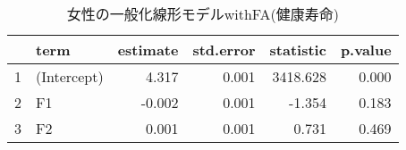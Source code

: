 \begin{table}[ht]
\centering
\begingroup\tiny
\begin{tabular}{rlrrrr}
  \hline
 & term & estimate & std.error & statistic & p.value \\ 
  \hline
1 & (Intercept) & 4.317 & 0.001 & 3418.628 & 0.000 \\ 
  2 & F1 & -0.002 & 0.001 & -1.354 & 0.183 \\ 
  3 & F2 & 0.001 & 0.001 & 0.731 & 0.469 \\ 
   \hline
\end{tabular}
\endgroup
\caption{女性の一般化線形モデルwithFA(健康寿命)} 
\label{table_Gamma_HLE_FA_f}
\end{table}
